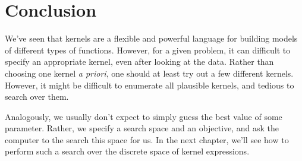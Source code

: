 \fi

\section{Conclusion}

We've seen that kernels are a flexible and powerful language for building models of different types of functions.
However, for a given problem, it can difficult to specify an appropriate kernel, even after looking at the data.
Rather than choosing one kernel \emph{a priori}, one should at least try out a few different kernels.
However, it might be difficult to enumerate all plausible kernels, and tedious to search over them.

Analogously, we usually don't expect to simply guess the best value of some parameter.
Rather, we specify a search space and an objective, and ask the computer to the search this space for us. 
In the next chapter, we'll see how to perform such a search over the discrete space of kernel expressions.


\outbpdocument{


}


